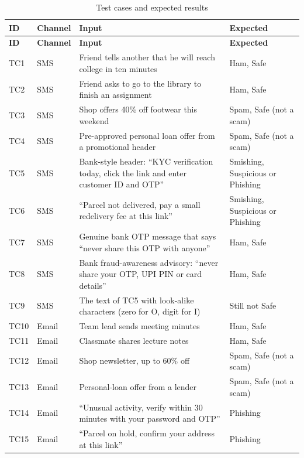 {{\small{}
\begin{longtable}{|p{1.1cm}|p{1.7cm}|p{6.9cm}|p{4.3cm}|}
\caption{Test cases and expected results}\label{tab:tc}\\
\hline \textbf{ID} & \textbf{Channel} & \textbf{Input} & \textbf{Expected} \\ \hline
\endfirsthead
\hline \textbf{ID} & \textbf{Channel} & \textbf{Input} & \textbf{Expected} \\ \hline
\endhead
\hline
\endfoot
TC1 & SMS & Friend tells another that he will reach college in ten minutes & Ham, Safe \\ \hline
TC2 & SMS & Friend asks to go to the library to finish an assignment & Ham, Safe \\ \hline
TC3 & SMS & Shop offers 40\% off footwear this weekend & Spam, Safe (not a scam) \\ \hline
TC4 & SMS & Pre-approved personal loan offer from a promotional header & Spam, Safe (not a scam) \\ \hline
TC5 & SMS & Bank-style header: ``KYC verification today, click the link and enter customer ID and OTP'' & Smishing, Suspicious or Phishing \\ \hline
TC6 & SMS & ``Parcel not delivered, pay a small redelivery fee at this link'' & Smishing, Suspicious or Phishing \\ \hline
TC7 & SMS & Genuine bank OTP message that says ``never share this OTP with anyone'' & Ham, Safe \\ \hline
TC8 & SMS & Bank fraud-awareness advisory: ``never share your OTP, UPI PIN or card details'' & Ham, Safe \\ \hline
TC9 & SMS & The text of TC5 with look-alike characters (zero for O, digit for I) & Still not Safe \\ \hline
TC10 & Email & Team lead sends meeting minutes & Ham, Safe \\ \hline
TC11 & Email & Classmate shares lecture notes & Ham, Safe \\ \hline
TC12 & Email & Shop newsletter, up to 60\% off & Spam, Safe (not a scam) \\ \hline
TC13 & Email & Personal-loan offer from a lender & Spam, Safe (not a scam) \\ \hline
TC14 & Email & ``Unusual activity, verify within 30 minutes with your password and OTP'' & Phishing \\ \hline
TC15 & Email & ``Parcel on hold, confirm your address at this link'' & Phishing \\ \hline

\end{longtable}}}
